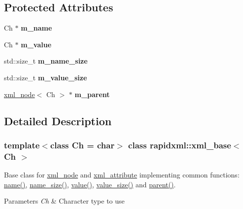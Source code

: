 \subsection*{Protected Attributes}
\begin{DoxyCompactItemize}
\item 
\mbox{\label{classrapidxml_1_1xml__base_afd9851ed43e14619db0d7075ef8e9e8a}} 
Ch $\ast$ {\bfseries m\+\_\+name}
\item 
\mbox{\label{classrapidxml_1_1xml__base_a278a1ea63b0b70219b946cec47fa00ea}} 
Ch $\ast$ {\bfseries m\+\_\+value}
\item 
\mbox{\label{classrapidxml_1_1xml__base_a5a8c76a7274b4180213796422c4df76f}} 
std\+::size\+\_\+t {\bfseries m\+\_\+name\+\_\+size}
\item 
\mbox{\label{classrapidxml_1_1xml__base_aa3a49d8ceddb8a8d7edb773a2226b89c}} 
std\+::size\+\_\+t {\bfseries m\+\_\+value\+\_\+size}
\item 
\mbox{\label{classrapidxml_1_1xml__base_a90d5f660f078f66563fd7b2d8387ccb0}} 
\hyperlink{classrapidxml_1_1xml__node}{xml\+\_\+node}$<$ Ch $>$ $\ast$ {\bfseries m\+\_\+parent}
\end{DoxyCompactItemize}


\subsection{Detailed Description}
\subsubsection*{template$<$class Ch = char$>$\newline
class rapidxml\+::xml\+\_\+base$<$ Ch $>$}

Base class for \hyperlink{classrapidxml_1_1xml__node}{xml\+\_\+node} and \hyperlink{classrapidxml_1_1xml__attribute}{xml\+\_\+attribute} implementing common functions\+: \hyperlink{classrapidxml_1_1xml__base_aef8ae147fbee59209f714274afc80dc4}{name()}, \hyperlink{classrapidxml_1_1xml__base_a20c8ffbe0c7a0b4231681ab8b99330a4}{name\+\_\+size()}, \hyperlink{classrapidxml_1_1xml__base_a6af65de5e59ac497cd69838f8a89d602}{value()}, \hyperlink{classrapidxml_1_1xml__base_a2eb123d471b1567fa4832b6ee2b75493}{value\+\_\+size()} and \hyperlink{classrapidxml_1_1xml__base_aa807062868d671a8c798d9d1bf016988}{parent()}. 
\begin{DoxyParams}{Parameters}
{\em Ch} & Character type to use \\
\hline
\end{DoxyParams}



